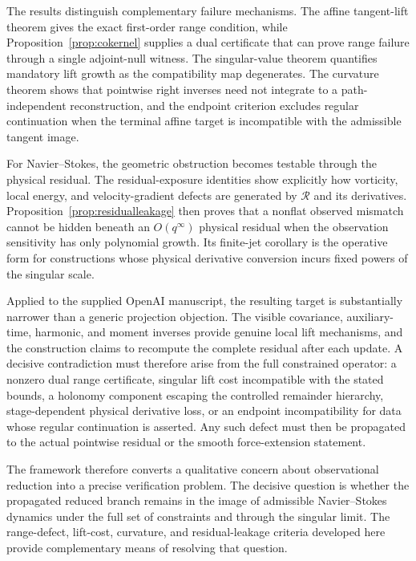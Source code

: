 \documentclass[12pt]{article}
\newcommand{\Rres}{\mathcal R}
\begin{document}
The results distinguish complementary failure mechanisms. The affine tangent-lift theorem gives the exact first-order range condition, while Proposition~\ref{prop:cokernel} supplies a dual certificate that can prove range failure through a single adjoint-null witness. The singular-value theorem quantifies mandatory lift growth as the compatibility map degenerates. The curvature theorem shows that pointwise right inverses need not integrate to a path-independent reconstruction, and the endpoint criterion excludes regular continuation when the terminal affine target is incompatible with the admissible tangent image.

For Navier--Stokes, the geometric obstruction becomes testable through the physical residual. The residual-exposure identities show explicitly how vorticity, local energy, and velocity-gradient defects are generated by $\Rres$ and its derivatives. Proposition~\ref{prop:residualleakage} then proves that a nonflat observed mismatch cannot be hidden beneath an $O(q^\infty)$ physical residual when the observation sensitivity has only polynomial growth. Its finite-jet corollary is the operative form for constructions whose physical derivative conversion incurs fixed powers of the singular scale.

Applied to the supplied OpenAI manuscript, the resulting target is substantially narrower than a generic projection objection. The visible covariance, auxiliary-time, harmonic, and moment inverses provide genuine local lift mechanisms, and the construction claims to recompute the complete residual after each update. A decisive contradiction must therefore arise from the full constrained operator: a nonzero dual range certificate, singular lift cost incompatible with the stated bounds, a holonomy component escaping the controlled remainder hierarchy, stage-dependent physical derivative loss, or an endpoint incompatibility for data whose regular continuation is asserted. Any such defect must then be propagated to the actual pointwise residual or the smooth force-extension statement.

The framework therefore converts a qualitative concern about observational reduction into a precise verification problem. The decisive question is whether the propagated reduced branch remains in the image of admissible Navier--Stokes dynamics under the full set of constraints and through the singular limit. The range-defect, lift-cost, curvature, and residual-leakage criteria developed here provide complementary means of resolving that question.
\appendix
\end{document}
